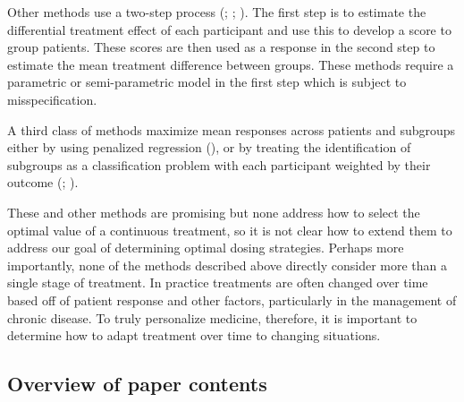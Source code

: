\documentclass[12pt]{article}
\begin{document}
Other methods use a two-step process (\cite{Cai2011}; \cite{Zhao2013}; \cite{Foster2011}). The first step is to estimate the differential treatment effect of each participant and use this to develop a score to group patients. These scores are then used as a response in the second step to estimate the mean treatment difference between groups. These methods require a parametric or semi-parametric model in the first step which is subject to misspecification. 

%
%
%

A third class of methods maximize mean responses across patients and subgroups either by using penalized regression (\cite{Qian2011}), or by treating the identification of subgroups as a classification problem with each participant weighted by their outcome (\cite{Zhao2012}; \cite{Zhang2012}).

These and other methods are promising but none address how to select the optimal value of a continuous treatment, so it is not clear how to extend them to address our goal of determining optimal dosing strategies. Perhaps more importantly, none of the methods described above directly consider more than a single stage of treatment. In practice treatments are often changed over time based off of patient response and other factors, particularly in the management of chronic disease. To truly personalize medicine, therefore, it is important to determine how to adapt treatment over time to changing situations. 





\subsection{Overview of paper contents} %
\label{sub:overview_of_contents}
\end{document}
